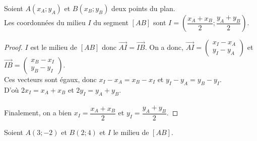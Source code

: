 \begin{Propriété}
Soient $A(x_A;y_A)$ et $B(x_B;y_B)$ deux points du plan. \\
Les coordonnées du milieu $I$ du segment $[AB]$ sont $I=\left(\dfrac{x_A+x_B}{2};\dfrac{y_A+y_B}{2}\right)$.

\end{Propriété}

\begin{proof}
$I$ est le milieu de $[AB]$ donc $\overrightarrow{AI}=\overrightarrow{IB}$. On a donc, $\overrightarrow{AI}=\begin{pmatrix} 
x_I-x_A \\
y_I-y_A
 \end{pmatrix}$ et $\overrightarrow{IB}=\begin{pmatrix} 
x_B-x_I \\
y_B-y_I
 \end{pmatrix}$. \\Ces vecteurs sont égaux, donc $x_I-x_A=x_B-x_I$ et $y_I-y_A=y_B-y_I$.\\
 D'où $2x_I=x_A+x_B$ et $2y_I=y_A+y_B$. \\
~\\
 Finalement, on a bien $x_I=\dfrac{x_A+x_B}{2}$ et $y_I=\dfrac{y_A+y_B}{2} $.
\end{proof}

\newpage

\begin{Exemple}
\begin{minipage}[c]{0.65\linewidth}

Soient $A(3;-2)$ et $B(2;4)$ et $I$ le milieu de $[AB]$.
\vspace{0.5cm}

\ligne

\ligne

\ligne


\end{minipage} \hfill
\begin{minipage}[c]{0.3\linewidth}
\end{minipage}

\end{Exemple}

